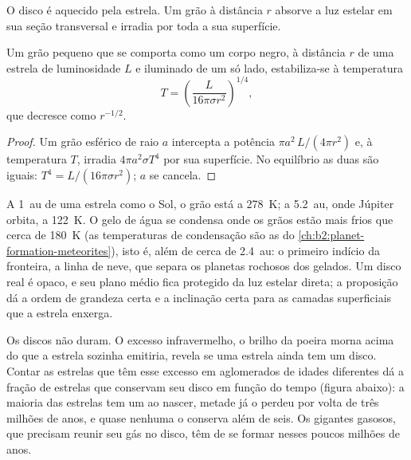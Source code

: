 O disco é aquecido pela estrela. Um grão à distância $r$ absorve a luz estelar
em sua seção transversal e irradia por toda a sua superfície.

\begin{proposition}
\label{prop:b2:ism-star-formation:grain}
Um grão pequeno que se comporta como um corpo negro, à distância $r$ de uma estrela de
luminosidade $L$ e iluminado de um só lado, estabiliza-se à temperatura
\[
  T = \left(\frac{L}{16\pi\sigma r^2}\right)^{1/4},
\]
que decresce como $r^{-1/2}$.
\end{proposition}

\begin{proof}
Um grão esférico de raio $a$ intercepta a potência $\pi a^2\,L/(4\pi r^2)$
e, à temperatura $T$, irradia $4\pi a^2\sigma T^4$ por sua superfície.
No equilíbrio as duas são iguais: $T^4 = L/(16\pi\sigma r^2)$; $a$ se cancela.
\end{proof}

A \qty{1}{au} de uma estrela como o Sol, o grão está a \qty{278}{K}; a
\qty{5.2}{au}, onde Júpiter orbita, a \qty{122}{K}. O gelo de água se condensa onde
os grãos estão mais frios que cerca de \qty{180}{K} (as temperaturas de condensação são
as do \cref{ch:b2:planet-formation-meteorites}), isto é, além de cerca de
\qty{2.4}{au}: o primeiro indício da fronteira, a linha de neve, que separa
os planetas rochosos dos gelados. Um disco real é opaco, e seu plano médio fica protegido da luz estelar direta; a
proposição dá a ordem de grandeza certa e a inclinação certa para as
camadas superficiais que a estrela enxerga.

Os discos não duram. O excesso infravermelho, o brilho da poeira morna acima do que a estrela
sozinha emitiria, revela se uma estrela ainda tem um disco. Contar as estrelas
que têm esse excesso em aglomerados de idades diferentes dá a fração de estrelas
que conservam seu disco em função do tempo (figura abaixo): a maioria das estrelas tem um
ao nascer, metade já o perdeu por volta de três milhões de anos, e quase nenhuma
o conserva além de seis. Os gigantes gasosos, que precisam reunir seu gás no disco,
têm de se formar nesses poucos milhões de anos.


